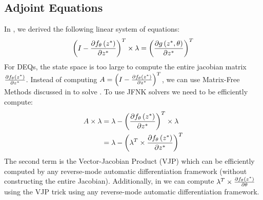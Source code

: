 



\subsection{Adjoint Equations}
\label{subsec:adjoint_equations_deqs}

In , we derived the following linear system of equations:
%
\begin{equation}
  \left( I - \frac{\partial f_\theta\left(z^*\right)}{\partial z^*} \right)^T \times \lambda = \left(\frac{\partial g\left(z^*, \theta\right)}{\partial z^*}\right)^T
\end{equation}
%
For DEQs, the state space is too large to compute the entire jacobian matrix $\frac{\partial f_\theta\left(z^*\right)}{\partial z^*}$. Instead of computing $ A = \left( I - \frac{\partial f_\theta\left(z^*\right)}{\partial z^*} \right)^T $, we can use Matrix-Free Methods discussed in  to solve . To use JFNK solvers we need to be efficiently compute:
%
\begin{align}
  A \times \lambda & = \lambda - \left( \frac{\partial f_\theta\left(z^*\right)}{\partial z^*} \right)^T  \times \lambda   \\
                   & = \lambda - \left( \lambda^T \times  \frac{\partial f_\theta\left(z^*\right)}{\partial z^*} \right)^T
\end{align}
%
The second term is the Vector-Jacobian Product (VJP) which can be efficiently computed by any reverse-mode automatic differentiation framework (without constructing the entire Jacobian). Additionally, in  we can compute $\lambda^T \times \frac{\partial f_\theta\left(z^*\right)}{\partial \theta}$ using the VJP trick using any reverse-mode automatic differentiation framework.

